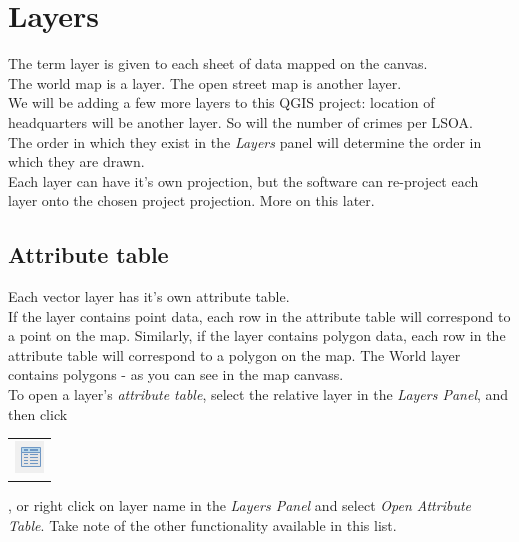 \chapter{Layers}

\pagestyle{fancy}
\fancyhf{}
\fancyhead[OC]{\leftmark}
\fancyhead[EC]{\rightmark}
\cfoot{\thepage}


The term layer is given to each sheet of data mapped on the canvas.\\
The world map is a layer. The open street map is another layer.\\
We will be adding a few more layers to this QGIS project: location of headquarters will be another layer. So will the number of crimes per LSOA.\\

The order in which they exist in the \textit{Layers} panel will determine the order in which they are drawn.\\

Each layer can have it's own projection, but the software can re-project each layer onto the chosen project projection. More on this later.\\

\section{Attribute table}

Each vector layer has it's own attribute table.\\

If the layer contains point data, each row in the attribute table will correspond to a point on the map. Similarly, if the layer contains polygon data, each row in the attribute table will correspond to a polygon on the map. The World layer contains polygons - as you can see in the map canvass.\\

To open a layer's \textit{attribute table}, select the relative layer in the \textit{Layers Panel}, and then click	\begin{tabular}{@{}c@{}}\includegraphics[width=4ex]{images/attribute_table_icon.png}\end{tabular}
, or right click on layer name in the \textit{Layers Panel} and select \textit{Open Attribute Table}. Take note of the other functionality available in this list.

